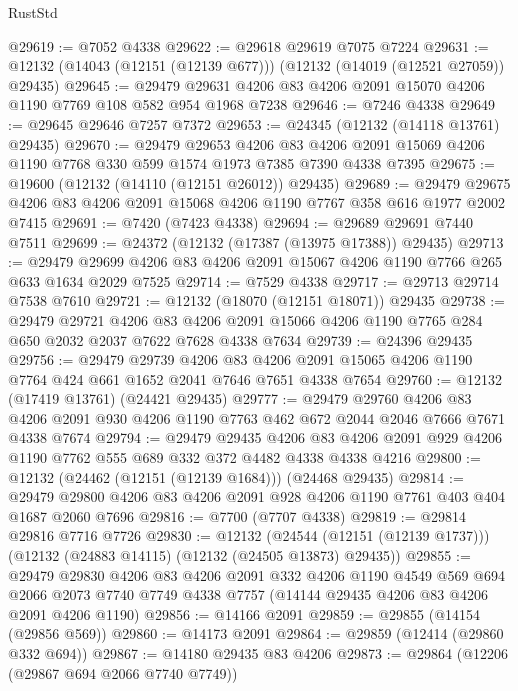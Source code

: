 \begin{lexlean}{RustStd}
\begin{coremodule}
{\begin{coremodule}
{{{{{{{{{{{{{{{{{{{{{{{{{{{{{{{{{{{{{{{{{{{{{{{{{{@29619 := @7052 @4338
@29622 := @29618 @29619 @7075 @7224
@29631 := @12132 (@14043 (@12151 (@12139 @677))) (@12132 (@14019 (@12521 @27059)) @29435)
@29645 := @29479 @29631 @4206 @83 @4206 @2091 @15070 @4206 @1190 @7769 @108 @582 @954 @1968 @7238
@29646 := @7246 @4338
@29649 := @29645 @29646 @7257 @7372
@29653 := @24345 (@12132 (@14118 @13761) @29435)
@29670 := @29479
    @29653
    @4206
    @83
    @4206
    @2091
    @15069
    @4206
    @1190
    @7768
    @330
    @599
    @1574
    @1973
    @7385
    @7390
    @4338
    @7395
@29675 := @19600 (@12132 (@14110 (@12151 @26012)) @29435)
@29689 := @29479 @29675 @4206 @83 @4206 @2091 @15068 @4206 @1190 @7767 @358 @616 @1977 @2002 @7415
@29691 := @7420 (@7423 @4338)
@29694 := @29689 @29691 @7440 @7511
@29699 := @24372 (@12132 (@17387 (@13975 @17388)) @29435)
@29713 := @29479 @29699 @4206 @83 @4206 @2091 @15067 @4206 @1190 @7766 @265 @633 @1634 @2029 @7525
@29714 := @7529 @4338
@29717 := @29713 @29714 @7538 @7610
@29721 := @12132 (@18070 (@12151 @18071)) @29435
@29738 := @29479
    @29721
    @4206
    @83
    @4206
    @2091
    @15066
    @4206
    @1190
    @7765
    @284
    @650
    @2032
    @2037
    @7622
    @7628
    @4338
    @7634
@29739 := @24396 @29435
@29756 := @29479
    @29739
    @4206
    @83
    @4206
    @2091
    @15065
    @4206
    @1190
    @7764
    @424
    @661
    @1652
    @2041
    @7646
    @7651
    @4338
    @7654
@29760 := @12132 (@17419 @13761) (@24421 @29435)
@29777 := @29479
    @29760
    @4206
    @83
    @4206
    @2091
    @930
    @4206
    @1190
    @7763
    @462
    @672
    @2044
    @2046
    @7666
    @7671
    @4338
    @7674
@29794 := @29479
    @29435
    @4206
    @83
    @4206
    @2091
    @929
    @4206
    @1190
    @7762
    @555
    @689
    @332
    @372
    @4482
    @4338
    @4338
    @4216
@29800 := @12132 (@24462 (@12151 (@12139 @1684))) (@24468 @29435)
@29814 := @29479 @29800 @4206 @83 @4206 @2091 @928 @4206 @1190 @7761 @403 @404 @1687 @2060 @7696
@29816 := @7700 (@7707 @4338)
@29819 := @29814 @29816 @7716 @7726
@29830 := @12132
    (@24544 (@12151 (@12139 @1737)))
    (@12132 (@24883 @14115) (@12132 (@24505 @13873) @29435))
@29855 := @29479
    @29830
    @4206
    @83
    @4206
    @2091
    @332
    @4206
    @1190
    @4549
    @569
    @694
    @2066
    @2073
    @7740
    @7749
    @4338
    @7757
    (@14144 @29435 @4206 @83 @4206 @2091 @4206 @1190)
@29856 := @14166 @2091
@29859 := @29855 (@14154 (@29856 @569))
@29860 := @14173 @2091
@29864 := @29859 (@12414 (@29860 @332 @694))
@29867 := @14180 @29435 @83 @4206
@29873 := @29864 (@12206 (@29867 @694 @2066 @7740 @7749))
}}}}}}}}}}}}}}}}}}}}}}}}}}}}}}}}}}}}}}}}}}}}}}}}}}
\end{coremodule}}
\end{coremodule}
\end{lexlean}
